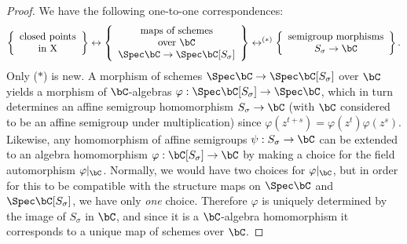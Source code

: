 \begin{proof}
	We have the following one-to-one correspondences:
	\begin{align*}
		\left\{\begin{array}{c}
			\text{closed points} \\
			\text{in X}
		\end{array}\right\} \leftrightarrow 
		\left\{\begin{array}{c}
			\text{maps of schemes} \\
			\text{over $\bC$} \\
			\Spec \bC \to \Spec \bC[S_\sigma]
		\end{array}\right\} \leftrightarrow^{(*)} 
		\left\{\begin{array}{c}
			\text{semigroup morphisms} \\
			S_\sigma \to \bC
		\end{array}\right\}.
	\end{align*}
	Only ($\ast$) is new. A morphism of schemes $\Spec \bC \to \Spec \bC[S_\sigma]$ over $\bC$ yields a morphism of $\bC$-algebras $\varphi:\Spec \bC[S_\sigma] \to \Spec \bC$, which in turn determines an affine semigroup homomorphism $S_\sigma \to \bC$ (with $\bC$ considered to be an affine semigroup under multiplication) since $\varphi(z^{t+s}) = \varphi(z^t)\varphi(z^s)$. Likewise, any homomorphism of affine semigroups $\psi:S_\sigma \to \bC$ can be extended to an algebra homomorphism $\varphi:\bC[S_\sigma]\to \bC$ by making a choice for the field automorphism $\varphi|_\bC$. Normally, we would have two choices for $\varphi|_\bC$, but in order for this to be compatible with the structure maps on $\Spec \bC$ and $\Spec \bC[S_\sigma]$, we have only \emph{one} choice. Therefore $\varphi$ is uniquely determined by the image of $S_\sigma$ in $\bC$, and since it is a $\bC$-algebra homomorphism it corresponds to a unique map of schemes over  $\bC$. 
\end{proof}

